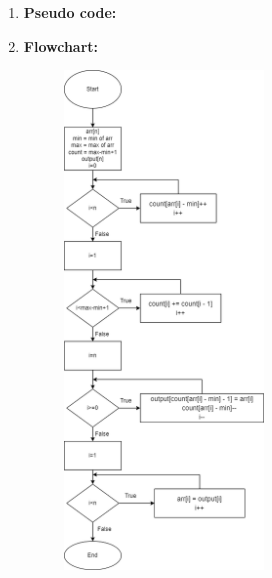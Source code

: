 \documentclass[11pt,a4paper]{article}
\begin{document}
{\begin{enumerate}[label=\textbf{\arabic*})]
					\textbf{Best case:} Occurs when all items are in the same range, or when k is equal to 1. In this scenario,  total time complexity is O(n), which is linear.
					
					\textbf{Worst case:} Occurs when the data range is huge, the maximum value is much bigger than the minimum one. In that case, the time complexity is O(n+k).
					
					\textbf{Average case:} To calculate the average case time complexity, fix N and take various values of k from 1 to infinity; in this scenario, k computes to (k+1/2), and the average case is N+(K+1)/2. However, because K approaches infinity, K is the essential element. Similarly, varying N reveals that both N and K are equally dominating, resulting in O(N+K) as the average case.
					
					\textbf{Space complexity}
					\\[9pt]
					Counting sort requires employing an auxiliary array of size k and an array to element in order which has n value. As a result, the Counting Sort algorithm has  space complexity O(n+k). The best case, worst case and average case are the same as time complexity
				\\[12pt]
				\item \textbf{Pseudo code:} 
				\pagebreak
				\item \textbf{Flowchart:}
					\begin{figure}[H]
						\centering 
						\includegraphics[width=0.5\textwidth]{CountingSort Flowchart}
					\end{figure}
					

\end{enumerate}}
\end{document}
